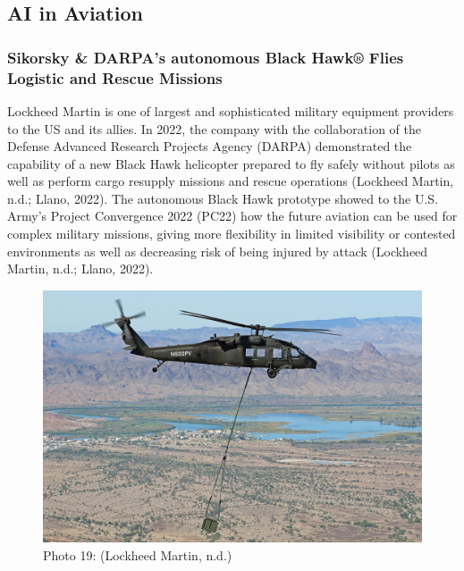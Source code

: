 \documentclass[
]{article}
\begin{document}
\hypertarget{ai-in-aviation}{%
\subsection{AI in Aviation}\label{ai-in-aviation}}

\hypertarget{sikorsky-darpas-autonomous-black-hawk-flies-logistic-and-rescue-missions}{%
\subsubsection{Sikorsky \& DARPA's autonomous Black Hawk® Flies Logistic and Rescue Missions}\label{sikorsky-darpas-autonomous-black-hawk-flies-logistic-and-rescue-missions}}

Lockheed Martin is one of largest and sophisticated military equipment providers to the US and its allies. In 2022, the company with the collaboration of the Defense Advanced Research Projects Agency (DARPA) demonstrated the capability of a new Black Hawk helicopter prepared to fly safely without pilots as well as perform cargo resupply missions and rescue operations (Lockheed Martin, n.d.; Llano, 2022). The autonomous Black Hawk prototype showed to the U.S. Army's Project Convergence 2022 (PC22) how the future aviation can be used for complex military missions, giving more flexibility in limited visibility or contested environments as well as decreasing risk of being injured by attack (Lockheed Martin, n.d.; Llano, 2022).

\begin{figure}
\centering
\includegraphics{Hawk2.jpg}
\caption{Photo 19: (Lockheed Martin, n.d.)}
\end{figure}
\end{document}
